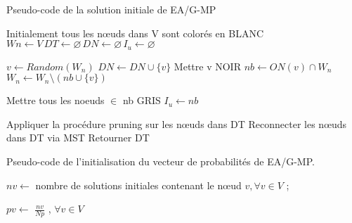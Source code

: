 \cleardoublepage


\begin{algorithm}[h!]
\label{alg3:PCSIEAGMP}
\caption{Pseudo-code de la solution initiale de EA/G-MP}
\SetAlgoLined
\DontPrintSemicolon

Initialement tous les nœuds dans V sont colorés en BLANC \;
$W n \gets V \, DT \gets \varnothing \, DN \gets \varnothing \, I_u \gets \varnothing $ \;

$v \gets Random(W_n)$ \;
$ DN \gets DN \cup \{ v \} $ \;
Mettre v NOIR \;
$ nb \gets ON( v ) \cap W_n $ \;
$ W_n \gets W_n \setminus ( nb \cup \{ v \})$ \;

Mettre tous les noeuds $\in$ nb GRIS \;
$I_u \gets nb$ \;


Appliquer la procédure pruning sur les nœuds dans DT \;
Reconnecter les nœuds dans DT via MST \;
Retourner DT \;

\end{algorithm}





\cleardoublepage


\begin{algorithm}[h!]
\label{alg3:IVPEAMP}
\caption{Pseudo-code de l'initialisation du vecteur de probabilités de EA/G-MP.}
\SetAlgoLined
\DontPrintSemicolon

$ nv \gets $ nombre de solutions initiales contenant le nœud $v, \forall v \in V$ ;

$ pv \gets$ \( \displaystyle \frac{nv}{Np} \) ,  $\forall v \in V $ \;


\end{algorithm}



\cleardoublepage


